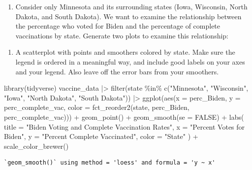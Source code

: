 \documentclass[
  letterpaper,
  DIV=11,
  numbers=noendperiod]{scrartcl}
\newenvironment{Shaded}{\begin{snugshade}}{\end{snugshade}}
\newcommand{\AttributeTok}[1]{\textcolor[rgb]{0.40,0.45,0.13}{#1}}
\newcommand{\ConstantTok}[1]{\textcolor[rgb]{0.56,0.35,0.01}{#1}}
\newcommand{\FunctionTok}[1]{\textcolor[rgb]{0.28,0.35,0.67}{#1}}
\newcommand{\NormalTok}[1]{\textcolor[rgb]{0.00,0.23,0.31}{#1}}
\newcommand{\SpecialCharTok}[1]{\textcolor[rgb]{0.37,0.37,0.37}{#1}}
\newcommand{\StringTok}[1]{\textcolor[rgb]{0.13,0.47,0.30}{#1}}
\providecommand{\tightlist}{%
  \setlength{\itemsep}{0pt}\setlength{\parskip}{0pt}}
\begin{document}
\begin{enumerate}
\def\labelenumi{\arabic{enumi}.}
\tightlist
\item
  Consider only Minnesota and its surrounding states (Iowa, Wisconsin,
  North Dakota, and South Dakota). We want to examine the relationship
  between the percentage who voted for Biden and the percentage of
  complete vaccinations by state. Generate two plots to examine this
  relationship:
\end{enumerate}

\begin{enumerate}
\def\labelenumi{\alph{enumi})}
\tightlist
\item
  A scatterplot with points and smoothers colored by state. Make sure
  the legend is ordered in a meaningful way, and include good labels on
  your axes and your legend. Also leave off the error bars from your
  smoothers.
\end{enumerate}

\begin{Shaded}
\begin{Highlighting}[]
\FunctionTok{library}\NormalTok{(tidyverse)}
\NormalTok{vaccine\_data }\SpecialCharTok{|\textgreater{}}
  \FunctionTok{filter}\NormalTok{(state }\SpecialCharTok{\%in\%} \FunctionTok{c}\NormalTok{(}\StringTok{"Minnesota"}\NormalTok{, }\StringTok{"Wisconsin"}\NormalTok{, }\StringTok{"Iowa"}\NormalTok{, }\StringTok{"North Dakota"}\NormalTok{, }\StringTok{"South Dakota"}\NormalTok{)) }\SpecialCharTok{|\textgreater{}}
  \FunctionTok{ggplot}\NormalTok{(}\FunctionTok{aes}\NormalTok{(}\AttributeTok{x =}\NormalTok{ perc\_Biden, }\AttributeTok{y =}\NormalTok{ perc\_complete\_vac, }\AttributeTok{color =} \FunctionTok{fct\_reorder2}\NormalTok{(state, perc\_Biden, perc\_complete\_vac))) }\SpecialCharTok{+}
  \FunctionTok{geom\_point}\NormalTok{() }\SpecialCharTok{+} \FunctionTok{geom\_smooth}\NormalTok{(}\AttributeTok{se =} \ConstantTok{FALSE}\NormalTok{) }\SpecialCharTok{+}
  \FunctionTok{labs}\NormalTok{(}
    \AttributeTok{title =} \StringTok{"Biden Voting and Complete Vaccination Rates"}\NormalTok{,}
    \AttributeTok{x =} \StringTok{"Percent Votes for Biden"}\NormalTok{,}
    \AttributeTok{y =} \StringTok{"Percent Complete Vaccinated"}\NormalTok{,}
    \AttributeTok{color =} \StringTok{"State"}
\NormalTok{  ) }\SpecialCharTok{+}
  \FunctionTok{scale\_color\_brewer}\NormalTok{()}
\end{Highlighting}
\end{Shaded}

\begin{verbatim}
`geom_smooth()` using method = 'loess' and formula = 'y ~ x'
\end{verbatim}
\end{document}
